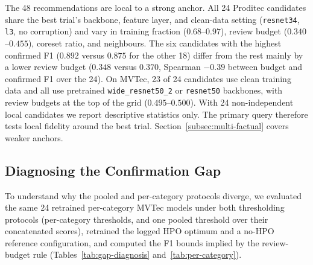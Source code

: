 \documentclass[final,5p,times,twocolumn]{elsarticle}
\begin{document}
The 48 recommendations are local to a strong anchor. All 24 Proditec
candidates share the best trial's backbone, feature layer, and
clean-data setting (\texttt{resnet34}, \texttt{l3}, no corruption) and
vary in training fraction ($0.68$--$0.97$), review budget
($0.340$--$0.455$), coreset ratio, and neighbours. The six candidates
with the highest confirmed F1 ($0.892$ versus $0.875$ for the other 18)
differ from the rest mainly by a lower review budget ($0.348$ versus $0.370$, Spearman $-0.39$ between budget and confirmed F1 over the 24).
On MVTec, 23 of 24 candidates use clean training data and all use
pretrained \texttt{wide\_resnet50\_2} or \texttt{resnet50} backbones,
with review budgets at the top of the grid ($0.495$--$0.500$). With 24 non-independent local candidates we report descriptive statistics only.
The primary query therefore tests local fidelity around the best trial. Section~\ref{subsec:multi-factual} covers weaker anchors.



\subsection{Diagnosing the Confirmation Gap}
\label{subsec:gap-diagnosis}

To understand why the pooled and per-category protocols diverge, we
evaluated the same 24 retrained per-category MVTec models under both thresholding protocols (per-category thresholds, and one pooled threshold over their concatenated scores),
retrained the logged HPO optimum and a no-HPO reference configuration,
and computed the F1 bounds implied by the review-budget rule
(Tables~\ref{tab:gap-diagnosis} and~\ref{tab:per-category}).
\end{document}
